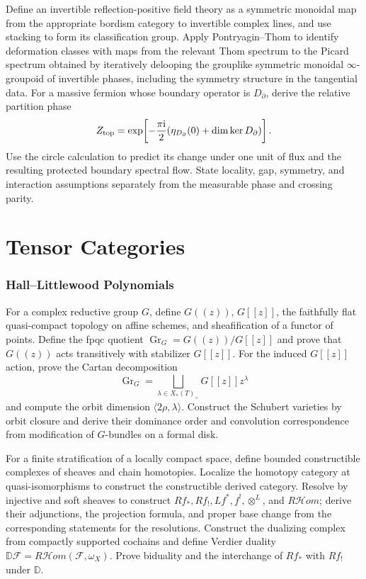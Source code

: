 \begin{exercise}
Define an invertible reflection-positive field theory as a symmetric
monoidal map from the appropriate bordism category to invertible complex
lines, and use stacking to form its classification group.  Apply
Pontryagin--Thom to identify deformation classes with maps from the relevant
Thom spectrum to the Picard spectrum obtained by iteratively delooping the
grouplike symmetric monoidal $\infty$-groupoid of invertible phases, including the
symmetry structure in the tangential data.  For a
massive fermion whose boundary operator is $D_\partial$, derive the relative
partition phase
\[
 Z_{\rm top}=\exp\!\left[-\frac{\pi\mathrm i}{2}
 (\eta_{D_\partial}(0)+\dim\ker D_\partial)\right].
\]
Use the circle calculation to predict its change under one unit of flux and
the resulting protected boundary spectral flow.  State locality, gap,
symmetry, and interaction assumptions separately from the measurable phase
and crossing parity.
\end{exercise}

\part{Tensor Categories}

\section{Hall--Littlewood Polynomials}

\begin{exercise}
For a complex reductive group $G$, define
$G((z))$, $G[[z]]$, the faithfully flat quasi-compact topology on affine
schemes, and sheafification of a functor of points.  Define the fpqc quotient
$\operatorname{Gr}_G=G((z))/G[[z]]$ and prove that $G((z))$ acts transitively
with stabilizer $G[[z]]$.  For the induced $G[[z]]$ action, prove the Cartan
decomposition
\[
 \operatorname{Gr}_G=\bigsqcup_{\lambda\in X_*(T)_+}
 G[[z]]z^\lambda
\]
and compute the orbit dimension $\langle2\rho,\lambda\rangle$.  Construct
the Schubert varieties by orbit closure and derive their dominance order and
convolution correspondence from modification of $G$-bundles on a formal disk.
\end{exercise}

\begin{exercise}
For a finite stratification of a locally compact space, define bounded
constructible complexes of sheaves and chain homotopies.  Localize the
homotopy category at quasi-isomorphisms to construct the constructible derived
category.  Resolve by injective and soft sheaves to construct
$Rf_*,Rf_!,Lf^*,f^!,\otimes^L$, and $R\mathcal Hom$; derive their adjunctions,
the projection formula, and proper base change from the corresponding
statements for the resolutions.  Construct the dualizing complex from compactly
supported cochains and define Verdier duality
$\mathbb D\mathcal F=R\mathcal Hom(\mathcal F,\omega_X)$.  Prove biduality and
the interchange of $Rf_*$ with $Rf_!$ under $\mathbb D$.
\end{exercise}


